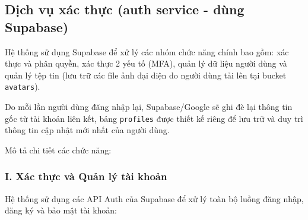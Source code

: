 \subsection{Dịch vụ xác thực (auth service - dùng Supabase)}

Hệ thống sử dụng Supabase để xử lý các nhóm chức năng chính bao gồm: xác thực và phân quyền, xác thực 2 yếu tố (MFA), quản lý dữ liệu người dùng và quản lý tệp tin (lưu trữ các file ảnh đại diện do người dùng tải lên tại bucket \texttt{avatars}).

Do mỗi lần người dùng đăng nhập lại, Supabase/Google sẽ ghi đè lại thông tin gốc từ tài khoản liên kết, bảng \texttt{profiles} được thiết kế riêng để lưu trữ và duy trì thông tin cập nhật mới nhất của người dùng.

Mô tả chi tiết các chức năng:

\subsubsection{I. Xác thực và Quản lý tài khoản}

Hệ thống sử dụng các API Auth của Supabase để xử lý toàn bộ luồng đăng nhập, đăng ký và bảo mật tài khoản:

